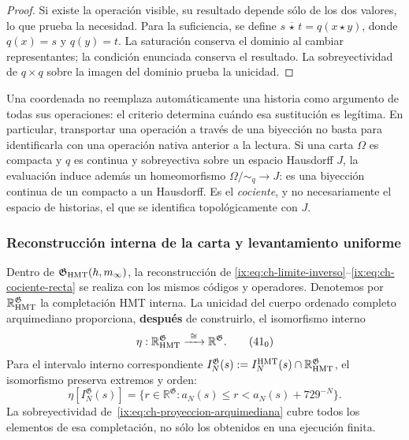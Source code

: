 \begin{proof}
Si existe la operación visible, su resultado depende sólo de los dos
valores, lo que prueba la necesidad. Para la suficiencia, se define
\(s\,\overline\star\,t=q(x\star y)\), donde \(q(x)=s\) y
\(q(y)=t\). La saturación conserva el dominio al cambiar representantes;
la condición enunciada conserva el resultado. La sobreyectividad de
\(q\times q\) sobre la imagen del dominio prueba la unicidad.
\end{proof}

Una coordenada no reemplaza automáticamente una historia como argumento de
todas sus operaciones: el criterio determina cuándo esa sustitución es
legítima. En particular, transportar una operación a través de una biyección
no basta para identificarla con una operación nativa anterior a la lectura.
Si una carta \(\Omega\) es compacta y \(q\) es continua y sobreyectiva
sobre un espacio Hausdorff \(J\), la evaluación induce además un
homeomorfismo \(\Omega/{\sim_q}\to J\): es una biyección continua de un
compacto a un Hausdorff. Es el \emph{cociente}, y no necesariamente el
espacio de historias, el que se identifica topológicamente con \(J\).



\subsubsection{Reconstrucción interna de la carta y levantamiento uniforme}

Dentro de \(\mathfrak G_{\rm HMT}(h,m_\infty)\), la reconstrucción de
\eqref{ix:eq:ch-limite-inverso}--\eqref{ix:eq:ch-cociente-recta} se realiza con los mismos códigos y operadores. Denotemos por
\(\mathbb R_{\rm HMT}^{\mathfrak G}\) la completación HMT interna. La
unicidad del cuerpo ordenado completo arquimediano proporciona, \textbf{después} de
construirlo, el isomorfismo interno
\[
 \eta:\mathbb R_{\rm HMT}^{\mathfrak G}
 \xrightarrow{\ \cong\ }\mathbb R^{\mathfrak G}.
\tag{41$_0$}\label{ix:eq:ch-isomorfismo-interno}
\]
Para el intervalo interno correspondiente
\(I_N^{\mathfrak G}(s):=
 I_N^{\rm HMT}(s)\cap\mathbb R_{\rm HMT}^{\mathfrak G}\), el isomorfismo
preserva extremos y orden:
\[
 \eta[I_N^{\mathfrak G}(s)]
 =\{r\in\mathbb R^{\mathfrak G}:
      a_N(s)\le r<a_N(s)+729^{-N}\}.
\tag{41$_0$a}\label{ix:eq:ch-intervalos-internos}
\]
La sobreyectividad de~\eqref{ix:eq:ch-proyeccion-arquimediana} cubre todos los elementos de esa completación, no
sólo los obtenidos en una ejecución finita.

